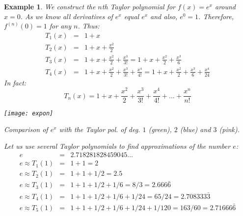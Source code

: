 \documentclass[12pt]{article}
\newtheorem{exa}{Example}
\begin{document}
\begin{exa}
We construct the $n$th Taylor polynomial for $f(x)=e^x$ around $x=0$. As we know all derivatives of $e^x$ equal $e^x$ and also, $e^0=1$. Therefore, $f^{(n)}(0)=1$ for any $n$. Thus:
\begin{eqnarray*}
T_1(x) &=& 1+x\\
T_2(x) &=& 1+x + \frac{x^2}{2}\\
T_3(x) &=& 1+x + \frac{x^2}{2}+ \frac{x^3}{3!}=1+x + \frac{x^2}{2} +\frac{x^3}{6}\\
T_4(x) &=& 1+x + \frac{x^2}{2}+ \frac{x^3}{3!}+ \frac{x^4}{4!}=1+x + \frac{x^2}{2}+ \frac{x^3}{6}+ \frac{x^4}{24}
\end{eqnarray*}
In fact:
$$T_n(x)=1+x + \frac{x^2}{2}+ \frac{x^3}{3!}+ \frac{x^4}{4!}+\ldots+\frac{x^n}{n!}$$
\begin{center}
\texttt{[image: expon]}

Comparison of $e^x$ with the Taylor pol. of deg. $1$ (green), $2$ (blue) and $3$ (pink).
\end{center}
Let us use several Taylor polynomials to find approximations of the number $e$:
\begin{eqnarray*}
e &=& 2.718281828459045\ldots\\
e\approx T_1(1) &=& 1+1=2\\
e \approx T_2(1) &=& 1+1+1/2=2.5 \\
e \approx T_3(1) &=& 1+1+1/2+1/6=8/3=2.666\bar{6} \\
e \approx T_4(1) &=& 1+1+1/2+1/6+1/24=65/24=2.708333\bar{3} \\
e \approx T_5(1) &=& 1+1+1/2+1/6+1/24+1/120=163/60=2.71666\bar{6} \\
\end{eqnarray*}
\end{exa}
\end{document}

